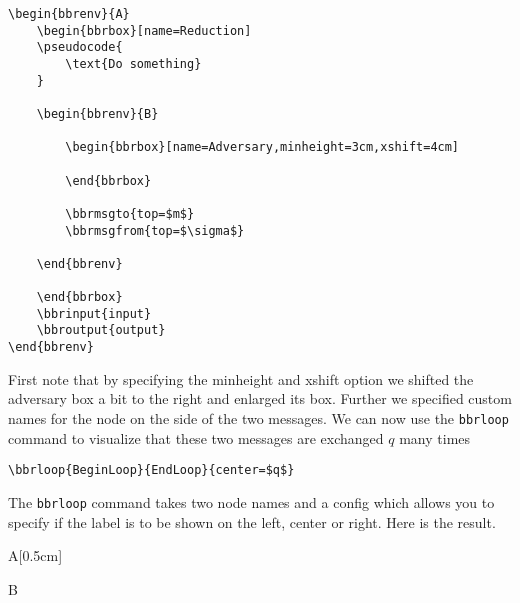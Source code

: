 \documentclass[a4paper]{report}
\begin{document}
\begin{lstlisting}
\begin{bbrenv}{A}
	\begin{bbrbox}[name=Reduction]
	\pseudocode{
		\text{Do something}
	}

	\begin{bbrenv}{B}

		\begin{bbrbox}[name=Adversary,minheight=3cm,xshift=4cm]

		\end{bbrbox}

		\bbrmsgto{top=$m$}
		\bbrmsgfrom{top=$\sigma$}

	\end{bbrenv}

	\end{bbrbox}
	\bbrinput{input}
	\bbroutput{output}
\end{bbrenv}
\end{lstlisting}

First note that by specifying the minheight and xshift option we shifted the adversary box a bit to the right
and enlarged its box. Further we specified custom names for the node on the  side of the two messages. We
can now use the \lstinline$bbrloop$ command to visualize that these two messages are exchanged $q$ many times
\begin{lstlisting}
\bbrloop{BeginLoop}{EndLoop}{center=$q$}
\end{lstlisting}
The \lstinline$bbrloop$ command takes two node names and a config which allows you to specify if the label is
to be shown on the left, center or right. Here is the result.

\begin{bbrenv}[1cm]{A}[0.5cm]
	\begin{bbrbox}[name=Reduction]

	\begin{bbrenv}{B}

		\begin{bbrbox}[name=Adversary,minheight=3cm,xshift=4cm]

		\end{bbrbox}

		\bbrmsgspace{0.5cm}

	\end{bbrenv}

	\end{bbrbox}
\end{bbrenv}
\end{document}
